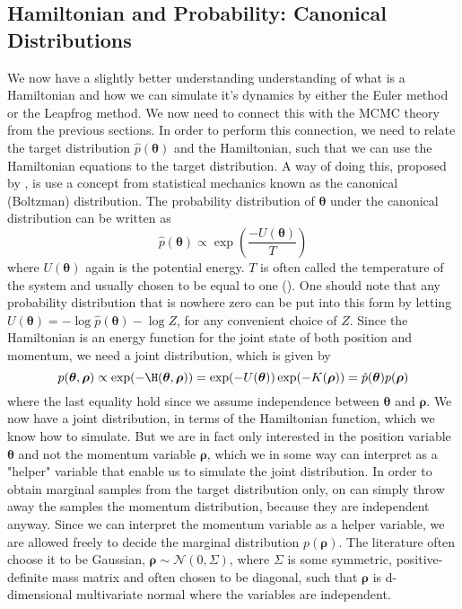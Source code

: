 \subsection{Hamiltonian and Probability: Canonical Distributions}
We now have a slightly better understanding understanding of what is a Hamiltonian and how we can simulate it's dynamics by either the Euler method or the Leapfrog method. We now need to connect this with the MCMC theory from the previous sections. In order to perform this connection, we need to relate the target distribution $\hat{p}(\boldsymbol{\theta})$ and the Hamiltonian, such that we can use the Hamiltonian equations to the target distribution. A way of doing this, proposed by \cite{neal2012bayesian}, is use a concept from statistical mechanics known as the canonical (Boltzman) distribution. The probability distribution of $\boldsymbol{\theta}$ under the canonical distribution can be written as
\begin{equation*}
    \hat{p}(\boldsymbol{\theta})\propto \exp(\frac{-U(\boldsymbol{\theta})}{T})
\end{equation*}
where $U(\boldsymbol{\theta})$ again is the potential energy. $T$ is often called the temperature of the system and usually chosen to be equal to one (\cite{neal2012bayesian}).
One should note that any probability distribution that is nowhere zero can be put into this form by letting $U(\boldsymbol{\theta})=-\log \hat{p}(\boldsymbol{\theta})-\log Z$, for any convenient choice of $Z$.  Since the Hamiltonian is an energy function for the joint state of both position and momentum, we need a joint distribution, which is given by
\begin{equation*}
p(\boldsymbol{\theta},\boldsymbol{\rho})\propto \exp(-\H(\boldsymbol{\theta},\boldsymbol{\rho}))   = \exp(-U(\boldsymbol{\theta}))\exp(-K(\boldsymbol{\rho}))=\hat{p}(\boldsymbol{\theta})p(\boldsymbol{\rho})
\end{equation*}
where the last equality hold since we assume independence between $\boldsymbol{\theta}$ and $\boldsymbol{\rho}$. We now have a joint distribution, in terms of the Hamiltonian function, which we know how to simulate. But we are in fact only interested in the position variable $\boldsymbol{\theta}$ and not the momentum variable $\boldsymbol{\rho}$, which we in some way can interpret as a "helper" variable that enable us to simulate the joint distribution. In order to obtain marginal samples from the target distribution only, on can simply throw away the samples the momentum distribution, because they are independent anyway. Since we can interpret the momentum variable as a  helper variable, we are allowed freely to decide the marginal distribution $p(\boldsymbol{\rho})$. The literature often choose it to be Gaussian, $\boldsymbol{\rho}\sim \mathcal{N}\left(0, \Sigma \right)$, where $\Sigma$ is some symmetric, positive-definite mass matrix and often chosen to be diagonal, such that $\boldsymbol{\rho}$ is d-dimensional multivariate normal where the variables are independent. 
